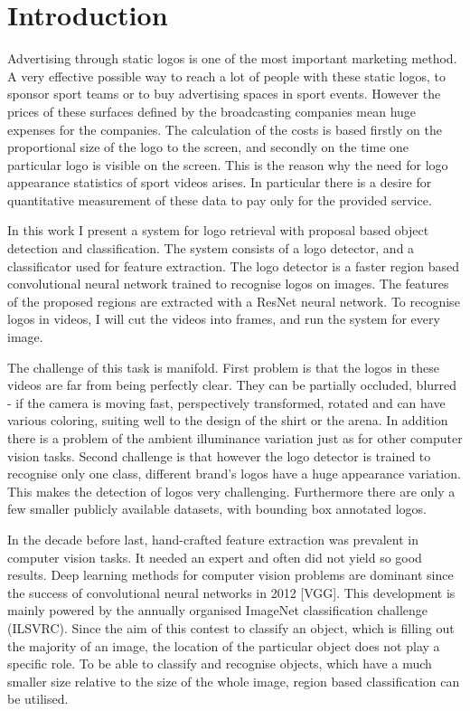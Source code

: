 \chapter{Introduction}

Advertising through static logos is one of the most important marketing method. A very effective possible way to reach a lot of people with these static logos, to sponsor sport teams or to buy advertising spaces in sport events. However the prices of these surfaces defined by the broadcasting companies mean huge expenses for the companies. The calculation of the costs is based firstly on the proportional size of the logo to the screen, and secondly on the time one particular logo is visible on the screen. This is the reason why the need for logo appearance statistics of sport videos arises. In particular there is a desire for quantitative measurement of these data to pay only for the provided service.

In this work I present a system for logo retrieval with proposal based object detection and classification. The system consists of a logo detector, and a classificator used for feature extraction. The logo detector is a faster region based convolutional neural network trained to recognise logos on images. The features of the proposed regions are extracted with a ResNet neural network. To recognise logos in videos, I will cut the videos into frames, and run the system for every image.

The challenge of this task is manifold. First problem is that the logos in these videos are far from being perfectly clear. They can be partially occluded, blurred - if the camera is moving fast, perspectively transformed, rotated and can have various coloring, suiting well to the design of the shirt or the arena. In addition there is a problem of the ambient illuminance variation just as for other computer vision tasks.
Second challenge is that however the logo detector is trained to recognise only one class, different brand's logos have a huge appearance variation. This makes the detection of logos very challenging.
Furthermore there are only a few smaller publicly available datasets, with bounding box annotated logos.

In the decade before last, hand-crafted feature extraction was prevalent in computer vision tasks. It needed an expert and often did not yield so good results. Deep learning methods for computer vision problems are dominant since the success of convolutional neural networks in 2012 [VGG]. This development is mainly powered by the annually organised ImageNet classification challenge (ILSVRC). Since the aim of this contest to classify an object, which is filling out the majority of an image, the location of the particular object does not play a specific role. To be able to classify and recognise objects, which have a much smaller size relative to the size of the whole image, region based classification can be utilised.

